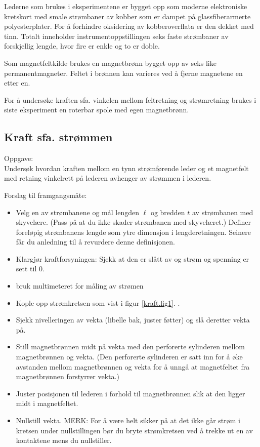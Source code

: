 \documentclass[../Elmag-labhefte-2020.tex]{subfiles}
\begin{document}
Lederne som brukes i eksperimentene er bygget opp som moderne elektroniske kretskort med smale strømbaner av kobber som er dampet på glassfiberarmerte polyesterplater. For å forhindre oksidering av kobberoverflata er den dekket med tinn. Totalt inneholder instrumentoppstillingen seks faste strømbaner av forskjellig lengde, hvor fire er enkle og to er doble.

Som magnetfeltkilde brukes en magnetbrønn bygget opp av seks like permanentmagneter. Feltet i brønnen kan varieres ved å fjerne magnetene en etter en. 

For å undersøke kraften sfa. vinkelen mellom feltretning og strømretning brukes i siste eksperiment en roterbar spole med egen magnetbrønn. 



\subsection{Kraft sfa. strømmen}

Oppgave: \\
{\itsf Undersøk hvordan kraften mellom en tynn strømførende leder og et magnetfelt med retning vinkelrett på lederen avhenger av strømmen i lederen.}

Forslag til framgangsmåte:
%
\vspace{-4mm} 
\begin{itemize}
    \item Velg en av strømbanene og mål lengden $\ell$ og bredden $t$ av strømbanen med skyvelære. (Pass på at du ikke skader strømbanen med skyvelæret.) Definer foreløpig strøm\-banens lengde som ytre dimensjon i lengderetningen.  %
    Seinere får du anledning til å revurdere denne definisjonen. 
     
    \item Klargjør kraftforsyningen: Sjekk at den er slått av og strøm og spenning er sett til 0. 
    \item bruk multimeteret for måling av strømen
    \item Kople opp strømkretsen som vist i figur \ref{kraft.fig1}. .
    \item Sjekk nivelleringen av vekta (libelle bak, juster føtter) og slå deretter vekta på.
    \item Still magnetbrønnen midt på vekta med den perforerte sylinderen mellom magnetbrønnen og vekta. %
    (Den perforerte sylinderen er satt inn for å øke avstanden mellom magnetbrønnen og vekta for å unngå at magnetfeltet fra magnetbrønnen forstyrrer vekta.) 
    \item Juster posisjonen til lederen i forhold til magnetbrønnen slik at den ligger midt i magnetfeltet.
    \item Nullstill vekta.
    MERK: For å være helt sikker på at det ikke går strøm i kretsen under nullstillingen bør du bryte strømkretsen ved å trekke ut en av kontaktene mens du nullstiller. 
    \end{itemize}
    
\end{document}
